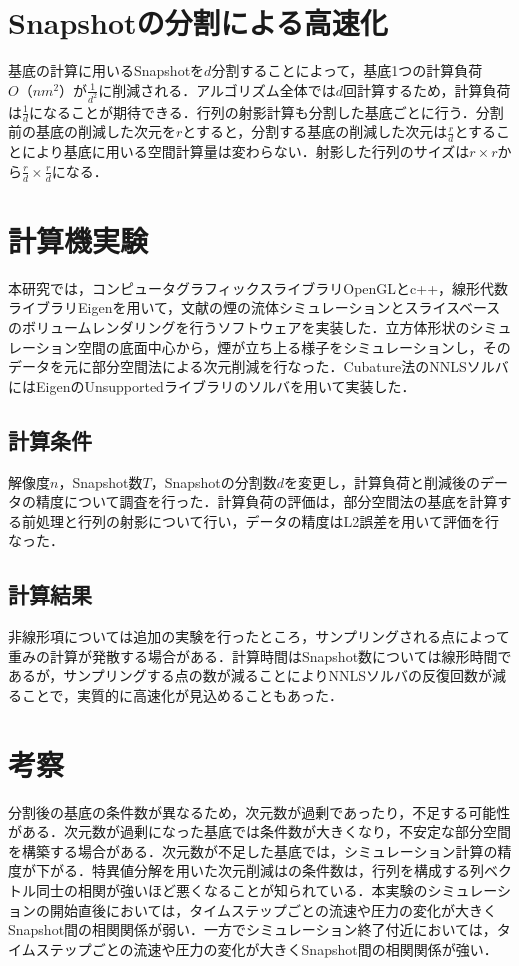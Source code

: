 \documentclass[a4j,12pt]{jreport}
\begin{document}
\section{Snapshotの分割による高速化}
基底の計算に用いるSnapshotを$d$分割することによって，基底1つの計算負荷$O（nm^2）$が$\frac{1}{d^2}$に削減される．アルゴリズム全体では$d$回計算するため，計算負荷は$\frac{1}{d}$になることが期待できる．行列の射影計算も分割した基底ごとに行う．分割前の基底の削減した次元を$r$とすると，分割する基底の削減した次元は$\frac{r}{d}$とすることにより基底に用いる空間計算量は変わらない．射影した行列のサイズは$r\times r$から$\frac{r}{d}\times \frac{r}{d}$になる．
\section{計算機実験}
本研究では，コンピュータグラフィックスライブラリOpenGLとc++，線形代数ライブラリEigenを用いて，文献\cite{fedkiw}の煙の流体シミュレーションとスライスベースのボリュームレンダリングを行うソフトウェアを実装した．立方体形状のシミュレーション空間の底面中心から，煙が立ち上る様子をシミュレーションし，そのデータを元に部分空間法による次元削減を行なった．Cubature法のNNLSソルバにはEigenのUnsupportedライブラリのソルバを用いて実装した．
\subsection{計算条件}
解像度$n$，Snapshot数$T$，Snapshotの分割数$d$を変更し，計算負荷と削減後のデータの精度について調査を行った．計算負荷の評価は，部分空間法の基底を計算する前処理と行列の射影について行い，データの精度はL2誤差を用いて評価を行なった．



\subsection{計算結果}
非線形項については追加の実験を行ったところ，サンプリングされる点によって重みの計算が発散する場合がある．計算時間はSnapshot数については線形時間であるが，サンプリングする点の数が減ることによりNNLSソルバの反復回数が減ることで，実質的に高速化が見込めることもあった．
\section{考察}
分割後の基底の条件数が異なるため，次元数が過剰であったり，不足する可能性がある．次元数が過剰になった基底では条件数が大きくなり，不安定な部分空間を構築する場合がある．次元数が不足した基底では，シミュレーション計算の精度が下がる．特異値分解を用いた次元削減はの条件数は，行列を構成する列ベクトル同士の相関が強いほど悪くなることが知られている．本実験のシミュレーションの開始直後においては，タイムステップごとの流速や圧力の変化が大きくSnapshot間の相関関係が弱い．一方でシミュレーション終了付近においては，タイムステップごとの流速や圧力の変化が大きくSnapshot間の相関関係が強い．
\end{document}
